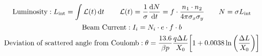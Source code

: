 \begin{gather*}
        \text{Luminosity}:
        L_{\mathrm{int}} = \int\operatorname{\mathcal{L}}(t)\dd{t}
        \qquad
        \operatorname{\mathcal{L}}(t)
        = \frac{1}{\sigma}\dv{N}{t}
        = f\cdot\frac{n_1\cdot n_2}{4\pi\sigma_x\sigma_y}
        \qquad
        N = \sigma L_{\mathrm{int}}
        \\
        \text{Beam Current}: I_i = N_i\cdot e\cdot f\cdot b
        \\
        \text{Deviation of scattered angle from Coulomb}: \theta = \frac{13.6}{\beta p}\frac{q\Delta L}{X_0}\qty[1 + 0.0038\ln\qty(\frac{\Delta L}{X_0})]
\end{gather*}
